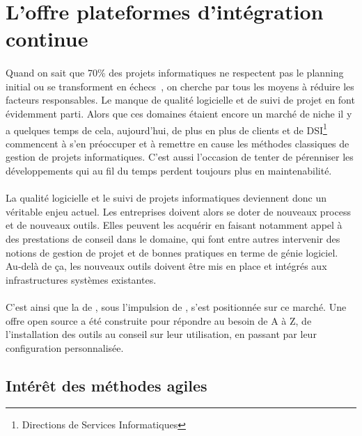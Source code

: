 \section{L'offre \og plateformes d'intégration continue \fg}
\label{section:pic}

\paragraph{}
Quand on sait que 70\% des projets informatiques ne respectent pas le planning initial ou se transforment en échecs~\cite{echec}, on cherche par tous les moyens à réduire les facteurs responsables.
Le manque de qualité logicielle et de suivi de projet en font évidemment parti.
Alors que ces domaines étaient encore un marché de niche il y a quelques temps de cela, aujourd'hui, de plus en plus de clients et de DSI\footnote{Directions de Services Informatiques} commencent à s'en préoccuper et à remettre en cause les méthodes classiques de gestion de projets informatiques.
C'est aussi l'occasion de tenter de pérenniser les développements qui au fil du temps perdent toujours plus en maintenabilité.

\paragraph{}
La qualité logicielle et le suivi de projets informatiques deviennent donc un véritable enjeu actuel.
Les entreprises doivent alors se doter de nouveaux process et de nouveaux outils. 
Elles peuvent les acquérir en faisant notamment appel à des prestations de conseil dans le domaine, qui font entre autres intervenir des notions de gestion de projet et de bonnes pratiques en terme de génie logiciel.
Au-delà de ça, les nouveaux outils doivent être mis en place et intégrés aux infrastructures systèmes existantes.

\paragraph{}
C'est ainsi que la \abusys{} de \asmile, sous l'impulsion de \agulet, s'est positionnée sur ce marché.
Une offre open source a été construite pour répondre au besoin de A à Z, de l'installation des outils au conseil sur leur utilisation, en passant par leur configuration personnalisée.



\subsection{Intérêt des méthodes agiles}

